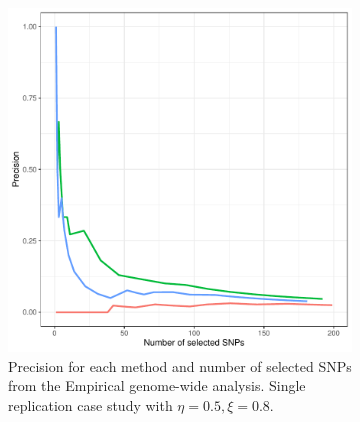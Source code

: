 \begin{figure}[H]
     \centering
     \begin{subfigure}[b]{0.4\textwidth}
         \centering
         \includegraphics[width=\textwidth]{figures/figure_05a.pdf}
         \caption{Precision for each method and number of selected SNPs from the Empirical genome-wide analysis. Single replication case study with $\eta = 0.5, \xi = 0.8$.}
        \label{fig:gw_prc}
     \end{subfigure}
     \hfill
     \begin{subfigure}[b]{0.4\textwidth}
         \centering

\end{subfigure}
\end{figure}
